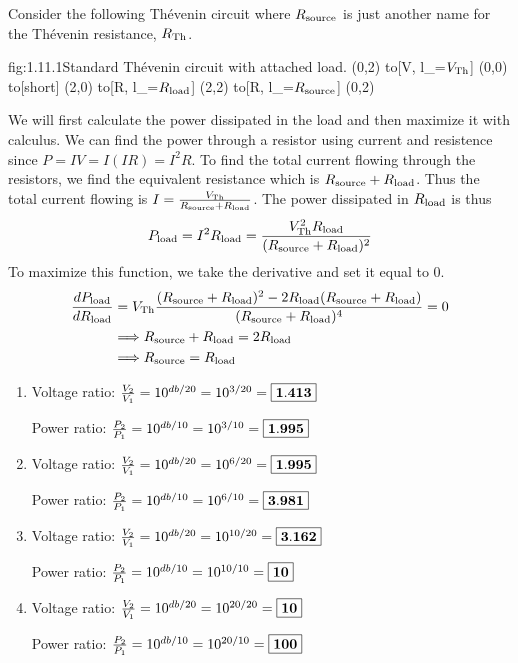 \documentclass{article}
\begin{document}
    Consider the following Th\'evenin circuit where $R_{\text{source}}$ is just another name for the Th\'evenin resistance, $R_{\text{Th}}$.
    \begin{circuit}{fig:1.11.1}{Standard Th\'evenin circuit with attached load.}
        (0,2) to[V, l_=$V_{\text{Th}}$] (0,0)
            to[short] (2,0)
            to[R, l_=$R_{\text{load}}$] (2,2)
            to[R, l_=$R_{\text{source}}$] (0,2)
    \end{circuit}
    We will first calculate the power dissipated in the load and then maximize it with calculus. We can find the power through a resistor using current and resistence since $P = IV = I(IR) = I^2R$. To find the total current flowing through the resistors, we find the equivalent resistance which is $R_{\text{source}} + R_{\text{load}}$. Thus the total current flowing is $I = \frac{V_{\text{Th}}}{R_{\text{source}} + R_{\text{load}}}$. The power dissipated in $R_{\text{load}}$ is thus 
    \[P_{\text{load}} = I^2R_{\text{load}} = \frac{V_{\text{Th}}^2 R_{\text{load}}}{(R_{\text{source}} + R_{\text{load}})^2}\]
    To maximize this function, we take the derivative and set it equal to 0.
    \begin{align*}
        \frac{dP_{\text{load}}}{dR_{\text{load}}} &= V_{\text{Th}} \frac{(R_{\text{source}} + R_{\text{load}})^2 - 2R_{\text{load}}(R_{\text{source}} + R_{\text{load}})}{(R_{\text{source}} + R_{\text{load}})^4} = 0 \\
        &\Longrightarrow R_{\text{source}} + R_{\text{load}} = 2R_{\text{load}} \\
        &\Longrightarrow R_{\text{source}} = R_{\text{load}}
    \end{align*}

    \begin{enumerate}
        \item 
        Voltage ratio: $\frac{V_2}{V_1} = 10^{db/20} = 10^{3/20} = \boxed{\mathbf{1.413}}$

        Power ratio: $\frac{P_2}{P_1} = 10^{db/10} = 10^{3/10} = \boxed{\mathbf{1.995}}$

        \item 
        Voltage ratio: $\frac{V_2}{V_1} = 10^{db/20} = 10^{6/20} = \boxed{\mathbf{1.995}}$

        Power ratio: $\frac{P_2}{P_1} = 10^{db/10} = 10^{6/10} = \boxed{\mathbf{3.981}}$
        
        \item 
        Voltage ratio: $\frac{V_2}{V_1} = 10^{db/20} = 10^{10/20} = \boxed{\mathbf{3.162}}$

        Power ratio: $\frac{P_2}{P_1} = 10^{db/10} = 10^{10/10} = \boxed{\mathbf{10}}$
        
        \item 
        Voltage ratio: $\frac{V_2}{V_1} = 10^{db/20} = 10^{20/20} = \boxed{\mathbf{10}}$

        Power ratio: $\frac{P_2}{P_1} = 10^{db/10} = 10^{20/10} = \boxed{\mathbf{100}}$
    \end{enumerate}
\end{document}
